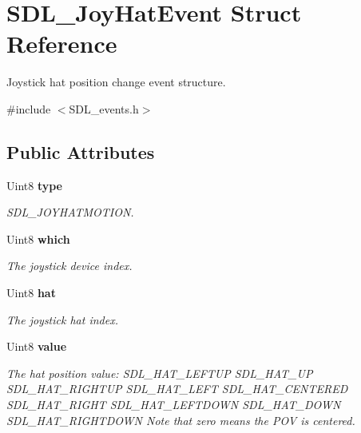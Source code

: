 \section{S\+D\+L\+\_\+\+Joy\+Hat\+Event Struct Reference}
\label{struct_s_d_l___joy_hat_event}


Joystick hat position change event structure.  




{\ttfamily \#include $<$S\+D\+L\+\_\+events.\+h$>$}

\subsection*{Public Attributes}
\begin{DoxyCompactItemize}
\item 
Uint8 {\bf type}\label{struct_s_d_l___joy_hat_event_a1592071b54de4fe74c087945f43a1d3f}

\begin{DoxyCompactList}\small\item\em S\+D\+L\+\_\+\+J\+O\+Y\+H\+A\+T\+M\+O\+T\+I\+O\+N. \end{DoxyCompactList}\item 
Uint8 {\bf which}\label{struct_s_d_l___joy_hat_event_a73ba3817ba1265f3878012c21462e74a}

\begin{DoxyCompactList}\small\item\em The joystick device index. \end{DoxyCompactList}\item 
Uint8 {\bf hat}\label{struct_s_d_l___joy_hat_event_ab1b54a6d1091e583e856f86b5af1e2f6}

\begin{DoxyCompactList}\small\item\em The joystick hat index. \end{DoxyCompactList}\item 
Uint8 {\bf value}\label{struct_s_d_l___joy_hat_event_a52b179a34407449941b61d988ca72ef4}

\begin{DoxyCompactList}\small\item\em The hat position value\+: S\+D\+L\+\_\+\+H\+A\+T\+\_\+\+L\+E\+F\+T\+U\+P S\+D\+L\+\_\+\+H\+A\+T\+\_\+\+U\+P S\+D\+L\+\_\+\+H\+A\+T\+\_\+\+R\+I\+G\+H\+T\+U\+P S\+D\+L\+\_\+\+H\+A\+T\+\_\+\+L\+E\+F\+T S\+D\+L\+\_\+\+H\+A\+T\+\_\+\+C\+E\+N\+T\+E\+R\+E\+D S\+D\+L\+\_\+\+H\+A\+T\+\_\+\+R\+I\+G\+H\+T S\+D\+L\+\_\+\+H\+A\+T\+\_\+\+L\+E\+F\+T\+D\+O\+W\+N S\+D\+L\+\_\+\+H\+A\+T\+\_\+\+D\+O\+W\+N S\+D\+L\+\_\+\+H\+A\+T\+\_\+\+R\+I\+G\+H\+T\+D\+O\+W\+N Note that zero means the P\+O\+V is centered. \end{DoxyCompactList}\end{DoxyCompactItemize}


